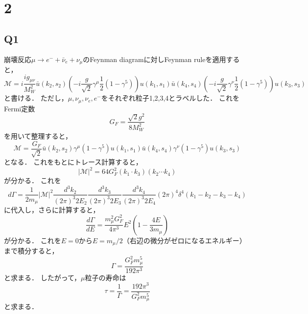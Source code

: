 \documentclass[a4paper,11pt]{jsarticle}
\begin{document}
\section*{2}

\subsection*{Q1}
崩壊反応$\mu \to e^- +\bar{\nu}_e+ \nu_{\mu}$のFeynman diagramに対しFeynman ruleを適用すると，
\begin{equation}
  \mathcal{M} = i\frac{ig_{\mu\nu}}{M_W^2}\bar{u}(k_2,s_2)\left(-i\frac{g}{\sqrt{2}}\gamma^\mu\frac{1}{2}(1-\gamma^5)\right)u(k_1,s_1)\bar{u}(k_4,s_4)\left(-i\frac{g}{\sqrt{2}}\gamma^\nu\frac{1}{2}(1-\gamma^5)\right)u(k_3,s_3)
\end{equation}
と書ける．
ただし，$\mu,\nu_{\mu},\nu_{e},e^-$をそれぞれ粒子1,2,3,4とラベルした．
これをFermi定数
\begin{equation}
  G_F = \frac{\sqrt{2}g^2}{8M_W^2}
\end{equation}
を用いて整理すると，
\begin{equation}
  \mathcal{M} = \frac{G_F}{\sqrt{2}}\bar{u}(k_2,s_2)\gamma^\mu (1-\gamma^5)u(k_1,s_1)\bar{u}(k_4,s_4)\gamma^\nu (1-\gamma^5)u(k_3,s_3)
\end{equation}
となる．
これをもとにトレース計算すると，
\begin{equation}
  \left|\mathcal{M}\right|^2 = 64G_F^2(k_1\cdot k_3)(k_2 \cdots k_4)
\end{equation}
が分かる．
これを
\begin{equation}
  d\Gamma = \frac{1}{2m_{\mu}}\left|\mathcal{M}\right|^2 \frac{d^3k_2}{(2\pi)^3 2E_2}\frac{d^3k_3}{(2\pi)^3 2E_3}\frac{d^3k_4}{(2\pi)^3 2E_4} (2\pi)^4\delta^4(k_1-k_2-k_3-k_4)
\end{equation}
に代入し，さらに計算すると，
\begin{equation}
  \frac{d\Gamma}{dE} = \frac{m_{\mu}^2G_F^2}{4\pi^3}E^2\left(1-\frac{4E}{3m_{\mu}}\right)
\end{equation}
が分かる．
これを$E=0$から$E=m_{\mu}/2$（右辺の微分がゼロになるエネルギー）まで積分すると，
\begin{equation}
  \Gamma = \frac{G_F^2 m_{\mu}^5}{192\pi^3}
\end{equation}
と求まる．
したがって，$\mu$粒子の寿命は
\begin{equation}
  \tau = \frac{1}{\Gamma} = \frac{192\pi^3}{G_F^2 m_{\mu}^5}
\end{equation}
と求まる．
\end{document}
